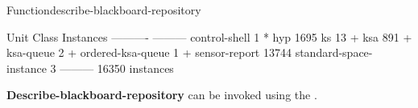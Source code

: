 \documentclass[10pt,twoside,english,pdftex]{article}
\begin{document}
\begin{functiondoc}{Function}{describe-blackboard-repository}{\noargs}
\begin{example}
Unit Class                    Instances
----------                    ---------
control-shell                         1 *
hyp                                1695
ks                                   13 + 
ksa                                 891 +
ksa-queue                             2 +
ordered-ksa-queue                     1 +
sensor-report                     13744
standard-space-instance               3
                              ---------
                                  16350 instances
\end{example}

\fnnote 
%
%
%
\textbf{Describe-blackboard-repository} can be invoked using the
 .

\end{functiondoc}

\end{document}
